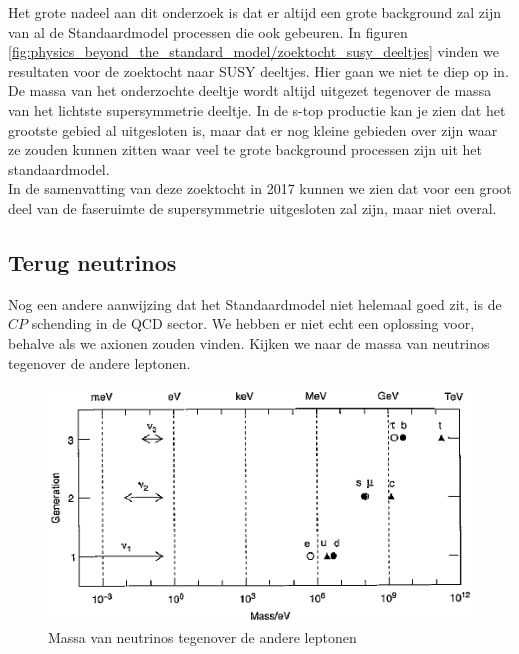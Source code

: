 \documentclass[../main.tex]{subfiles}
\begin{document}
Het grote nadeel aan dit onderzoek is dat er altijd een grote background zal zijn van al de Standaardmodel processen die ook gebeuren. In figuren \ref{fig:physics_beyond_the_standard_model/zoektocht_susy_deeltjes} vinden we resultaten voor de zoektocht naar SUSY deeltjes. Hier gaan we niet te diep op in. De massa van het onderzochte deeltje wordt altijd uitgezet tegenover de massa van het lichtste supersymmetrie deeltje. In de s-top productie kan je zien dat het grootste gebied al uitgesloten is, maar dat er nog kleine gebieden over zijn waar ze zouden kunnen zitten waar veel te grote background processen zijn uit het standaardmodel.\\
In de samenvatting van deze zoektocht in 2017 kunnen we zien dat voor een groot deel van de faseruimte de supersymmetrie uitgesloten zal zijn, maar niet overal.

\subsection{Terug neutrinos}%
\label{sub:terug_neutrinos}

Nog een andere aanwijzing dat het Standaardmodel niet helemaal goed zit, is de $CP$ schending in de QCD sector. We hebben er niet echt een oplossing voor, behalve als we axionen zouden vinden. Kijken we naar de massa van neutrinos tegenover de andere leptonen.

\begin{figure}[h]
    \centering
    \includegraphics[width=0.5\linewidth]{physics_beyond_the_standard_model/neutrino_massa.png}
    \caption{Massa van neutrinos tegenover de andere leptonen}%
    \label{fig:physics_beyond_the_standard_model/neutrino_massa}
\end{figure}
\end{document}
